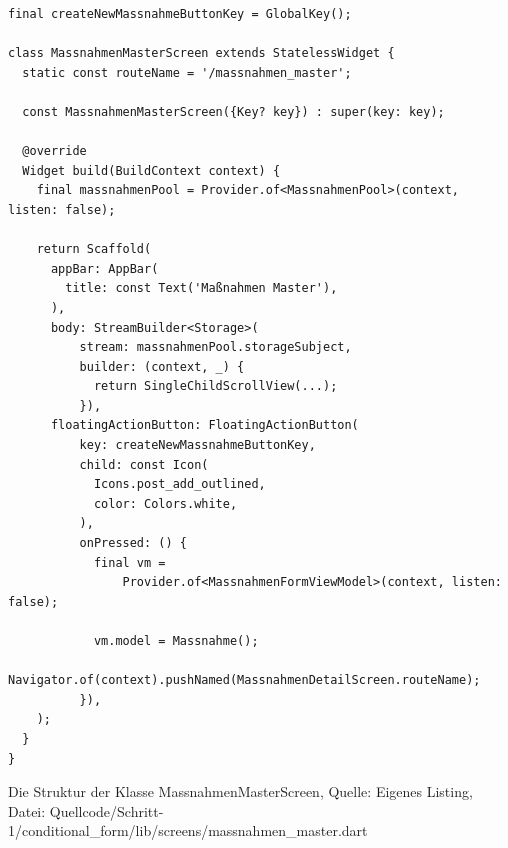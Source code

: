 \begin{listing}[htbp]
  \begin{verbatim}
final createNewMassnahmeButtonKey = GlobalKey();

class MassnahmenMasterScreen extends StatelessWidget {
  static const routeName = '/massnahmen_master';

  const MassnahmenMasterScreen({Key? key}) : super(key: key);

  @override
  Widget build(BuildContext context) {
    final massnahmenPool = Provider.of<MassnahmenPool>(context, listen: false);

    return Scaffold(
      appBar: AppBar(
        title: const Text('Maßnahmen Master'),
      ),
      body: StreamBuilder<Storage>(
          stream: massnahmenPool.storageSubject,
          builder: (context, _) {
            return SingleChildScrollView(...);
          }),
      floatingActionButton: FloatingActionButton(
          key: createNewMassnahmeButtonKey,
          child: const Icon(
            Icons.post_add_outlined,
            color: Colors.white,
          ),
          onPressed: () {
            final vm =
                Provider.of<MassnahmenFormViewModel>(context, listen: false);

            vm.model = Massnahme();
            Navigator.of(context).pushNamed(MassnahmenDetailScreen.routeName);
          }),
    );
  }
}

\end{verbatim}
  \caption[Schritt 1 Klasse MassnahmenMasterScreen Struktur]{Die Struktur der Klasse MassnahmenMasterScreen, Quelle: Eigenes Listing, \newline Datei: Quellcode/Schritt-1/conditional_form/lib/screens/massnahmen_master.dart}

  \label{lst:Schritt1KlasseMassnahmenMasterScreenStruktur}
\end{listing}



